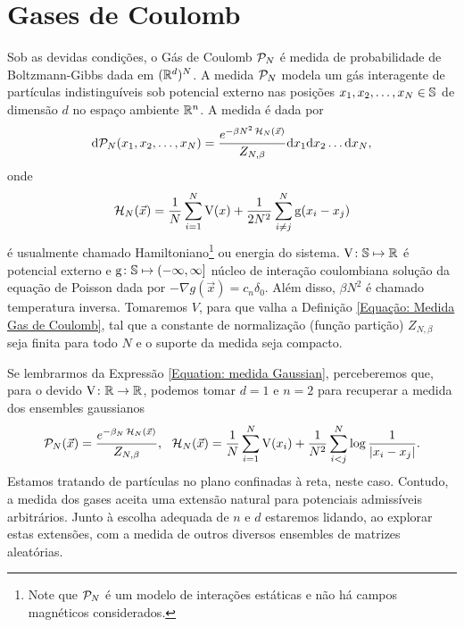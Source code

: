 \section{Gases de Coulomb}
\label{Section: Gases de Coulomb}

Sob as devidas condições, o Gás de Coulomb $\mathcal{P}_N$ é medida de probabilidade de Boltzmann-Gibbs dada em $(\mathbb{R}^d)^N$. \cite{ChafaCoulombMeasure} A medida $\mathcal{P}_N$ modela um gás interagente de partículas indistinguíveis sob potencial externo nas posições $x_1, x_2, \dots, x_N \in \mathbb{S}$ de dimensão $d$ no espaço ambiente $\mathbb{R}^n$. A medida é dada por 
\begin{equation}
	\dd \mathcal{P}_N(x_1, x_2, \dots, x_N) = \frac{e^{-\beta N^2 \operatorname{\mathcal{H}}_N(\vec{x})}}{Z_{N,\beta}} \dd x_1  \dd x_2  \dots  \dd x_N,
	\label{Equação: Medida Gas de Coulomb}
\end{equation}
onde $$\operatorname{\mathcal{H}}_N(\vec{x}) = \frac{1}{N} \sum_{i = 1}^{N} \operatorname{V}(x) + \frac{1}{2N^2} \sum_{i \neq j}^{N} \operatorname{g}(x_i - x_j)$$ é usualmente chamado Hamiltoniano\footnote{Note que $\mathcal{P}_N$ é um modelo de interações estáticas e não há campos magnéticos considerados.} ou energia do sistema. $\operatorname{V} \colon \mathbb{S} \mapsto \mathbb{R}$ é potencial externo e $\operatorname{g} \colon \mathbb{S} \mapsto (-\infty, \infty]$ núcleo de interação coulombiana solução da equação de Poisson dada por $- \nabla g(\vec{x}) = c_n\delta_0$. Além disso, $\beta N^2$ é chamado temperatura inversa. Tomaremos $V$, para que valha a Definição \eqref{Equação: Medida Gas de Coulomb}, tal que a constante de normalização (função partição) $Z_{N, \beta}$ seja finita para todo $N$ e o suporte da medida seja compacto.

Se lembrarmos da Expressão \eqref{Equation: medida Gaussian}, perceberemos que, para o devido $\operatorname{V} \colon \mathbb{R} \rightarrow \mathbb{R}$, podemos tomar $d=1$ e $n = 2$ para recuperar a medida dos ensembles gaussianos 
\begin{equation}
	\mathcal{P}_N(\vec{x}) = \frac{e^{-\beta_N \operatorname{\mathcal{H}}_N(\vec{x})}}{Z_{N,\beta}}, \ \ \operatorname{\mathcal{H}}_N(\vec{x}) = \frac{1}{N} \sum_{i = 1}^{N} \operatorname{V}(x_i) + \frac{1}{N^2} \sum_{i < j}^{N} \log{\frac{1}{|x_i - x_j|}}.
	\label{Equation: Medida Log V}
\end{equation}
Estamos tratando de partículas no plano confinadas à reta, neste caso. Contudo, a medida dos gases aceita uma extensão natural para potenciais admissíveis arbitrários. Junto à escolha adequada de $n$ e $d$ estaremos lidando, ao explorar estas extensões, com a medida de outros diversos ensembles de matrizes aleatórias.